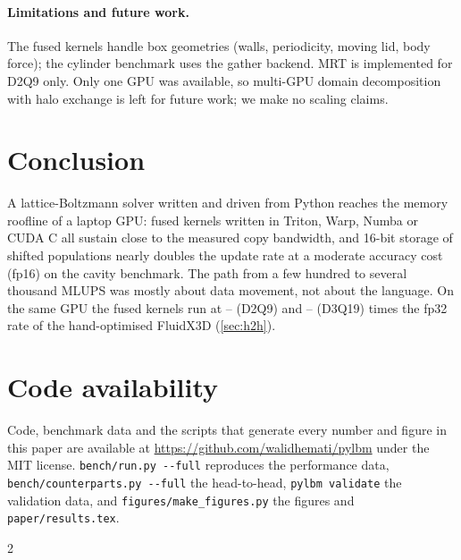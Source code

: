 \documentclass[11pt]{article}
\providecommand{\cpPyOverFxThree}{--}\providecommand{\cpPyOverFxTwo}{--}
\begin{document}
\paragraph{Limitations and future work.}
The fused kernels handle box geometries (walls, periodicity, moving lid, body force);
the cylinder benchmark uses the gather backend. MRT is implemented for D2Q9 only. Only one
GPU was available, so multi-GPU domain decomposition with halo exchange is left for future
work; we make no scaling claims.

\section{Conclusion}
A lattice-Boltzmann solver written and driven from Python reaches the memory roofline of a
laptop GPU: fused kernels written in Triton, Warp, Numba or CUDA C all sustain close to the
measured copy bandwidth, and 16-bit storage of shifted populations nearly doubles the update
rate at a moderate accuracy cost (fp16) on the cavity benchmark. The path from a few hundred to
several thousand MLUPS was mostly about data movement, not about the language. On the same
GPU the fused kernels run at \cpPyOverFxTwo{} (D2Q9) and \cpPyOverFxThree{} (D3Q19) times the
fp32 rate of the hand-optimised FluidX3D (\cref{sec:h2h}).

\section*{Code availability}
Code, benchmark data and the scripts that generate every number and figure in this paper are
available at \url{https://github.com/walidhemati/pylbm} under the MIT license.
\texttt{bench/run.py -{}-full} reproduces the performance data,
\texttt{bench/counterparts.py -{}-full} the head-to-head, \texttt{pylbm validate} the validation
data, and \texttt{figures/make\_figures.py} the figures and \texttt{paper/results.tex}.

{\footnotesize
\setlength{\bibsep}{1pt}

\begin{multicols}{2}

\end{multicols}
}
\end{document}
